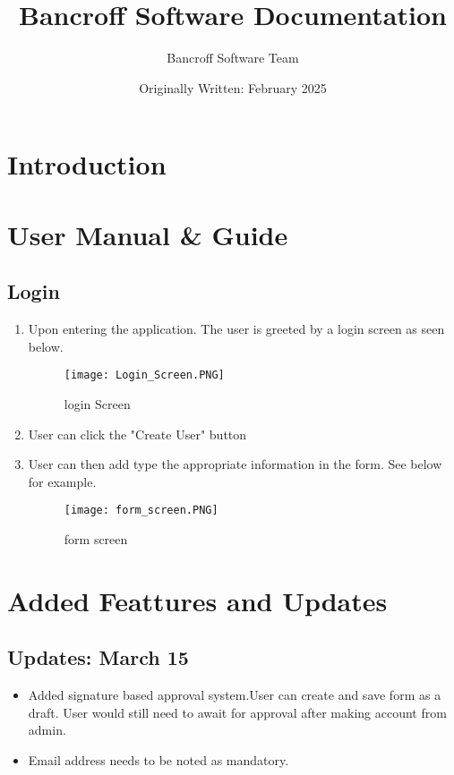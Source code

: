 \documentclass{article}
\title{Bancroff Software Documentation}
\author{Bancroff Software Team}
\date{Originally Written: February 2025}
\begin{document}
\maketitle

\section{Introduction}

\section{User Manual \& Guide}
    \subsection{Login}
        \begin{enumerate}
            \item Upon entering the application. The user is greeted by a login screen as seen below.
                \begin{figure}[h]
                \centering
                \texttt{[image: Login\_Screen.PNG]}
                \caption{login Screen}
                \end{figure}
            \item User can click the "Create User" button
            \item User can then add type the appropriate information in the form. See below for example.
                \begin{figure}[h]
                \centering
                \texttt{[image: form\_screen.PNG]}
                \caption{form screen}
                \end{figure}
        \end{enumerate}
    \section{Added Feattures and Updates}
        \subsection{Updates: March 15}
            \begin{itemize}
                \item
                    Added signature based approval system.User can create and save form as a draft.
                    User would still need to await for approval after making account from admin.
                \item
                    Email address needs to be noted as mandatory.
            \end{itemize}
\end{document}
